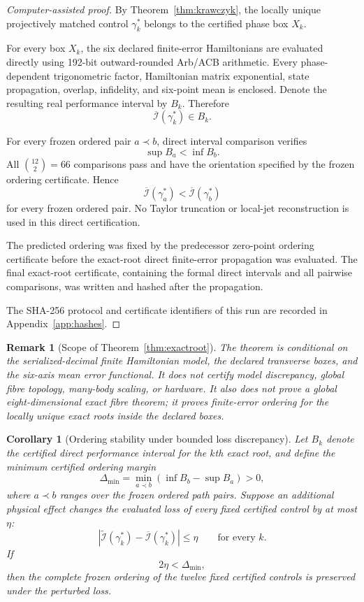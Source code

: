 \documentclass[11pt]{article}
\newtheorem{corollary}[theorem]{Corollary}
\newtheorem{remark}{Remark}
\begin{document}
\begin{proof}[Computer-assisted proof]
By Theorem~\ref{thm:krawczyk}, the locally unique projectively matched control $\gamma_k^\ast$ belongs to the certified phase box $X_k$.

For every box $X_k$, the six declared finite-error Hamiltonians are evaluated directly using 192-bit outward-rounded Arb/ACB arithmetic. Every phase-dependent trigonometric factor, Hamiltonian matrix exponential, state propagation, overlap, infidelity, and six-point mean is enclosed. Denote the resulting real performance interval by $B_k$. Therefore
\[
\overline{\mathcal I}(\gamma_k^\ast)\in B_k.
\]

For every frozen ordered pair $a\prec b$, direct interval comparison verifies
\[
\sup B_a<\inf B_b.
\]
All $\binom{12}{2}=66$ comparisons pass and have the orientation specified by the frozen ordering certificate. Hence
\[
\overline{\mathcal I}(\gamma_a^\ast)
<
\overline{\mathcal I}(\gamma_b^\ast)
\]
for every frozen ordered pair. No Taylor truncation or local-jet reconstruction is used in this direct certification.

The predicted ordering was fixed by the predecessor zero-point ordering certificate before the exact-root direct finite-error propagation was evaluated. The final exact-root certificate, containing the formal direct intervals and all pairwise comparisons, was written and hashed after the propagation.

The SHA-256 protocol and certificate identifiers of this run are recorded
in Appendix~\ref{app:hashes}.
\end{proof}

\begin{remark}[Scope of Theorem~\ref{thm:exactroot}]
The theorem is conditional on the serialized-decimal finite Hamiltonian model, the declared transverse boxes, and the six-axis mean error functional. It does not certify model discrepancy, global fibre topology, many-body scaling, or hardware. It also does not prove a global eight-dimensional exact fibre theorem; it proves finite-error ordering for the locally unique exact roots inside the declared boxes.
\end{remark}

\begin{corollary}[Ordering stability under bounded loss discrepancy]
\label{cor:discrepancy}
Let $B_k$ denote the certified direct performance interval for the $k$th
exact root, and define the minimum certified ordering margin
\[
\Delta_{\min}
=
\min_{a\prec b}
\left(
\inf B_b-\sup B_a
\right)>0,
\]
where $a\prec b$ ranges over the frozen ordered path pairs. Suppose an
additional physical effect changes the evaluated loss of every fixed
certified control by at most $\eta$:
\[
\left|
\widetilde{\mathcal I}(\gamma_k^\ast)
-
\overline{\mathcal I}(\gamma_k^\ast)
\right|
\le \eta
\qquad\text{for every }k.
\]
If
\[
2\eta<\Delta_{\min},
\]
then the complete frozen ordering of the twelve fixed certified controls is
preserved under the perturbed loss.
\end{corollary}
\end{document}
